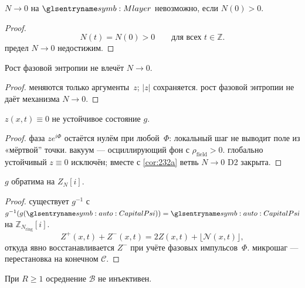 \begin{corollary}
\label{cor:232a}
$N\to 0$ на $\Mlayer$ невозможно, если $N(0)>0$.
\end{corollary}

\begin{proof}
\[
  N(t)=N(0)>0\qquad\text{для всех }t\in\mathbb{Z}.
\]
\phence предел $N\to 0$ недостижим.
\end{proof}

\begin{lemma}
\label{lem:233}
Рост фазовой энтропии не влечёт $N\to 0$.
\end{lemma}

\begin{proof}
меняются только аргументы~$z$; $|z|$ сохраняется.
\pfollows
рост фазовой энтропии не даёт механизма $N\to 0$.
\end{proof}

\begin{lemma}
\label{lem:234}
$z(x,t)\equiv 0$ не устойчивое состояние $g$.
\end{lemma}

\begin{proof}
фаза $z e^{i\Phi}$ остаётся нулём при любой~$\Phi$:
локальный шаг не выводит поле из «мёртвой'' точки.
вакуум --- осциллирующий фон с $\rho_{\mathrm{field}}>0$.
\phence глобально устойчивый $z\equiv 0$ исключён; вместе с \cref{cor:232a} ветвь $N\to 0$ D2 закрыта.
\end{proof}

\begin{lemma}[Микрообратимость]
\label{lem:235}
$g$ обратима на $Z_N[i]$.
\end{lemma}

\begin{proof}
существует $g^{-1}$ с $g^{-1}(g(\symCapitalPsi))=\symCapitalPsi$ на $\mathbb{Z}_{N_{\mathrm{ring}}}[i]$.
\[
  Z^+(x,t)+Z^-(x,t)=2Z(x,t)+\lfloor\mathcal{N}(x,t)\rfloor,
\]
откуда явно восстанавливается $Z^-$ при учёте фазовых импульсов~$\Phi$.
\pfollows
микрошаг --- перестановка на конечном $\mathcal{C}$.
\end{proof}

\begin{lemma}
\label{lem:236}
При $R\ge 1$ осреднение $\mathcal{B}$ не инъективен.
\end{lemma}

